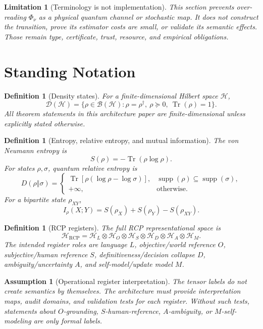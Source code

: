 \documentclass[11pt,a4paper]{article}
\newtheorem{definition}[theorem]{Definition}
\newtheorem{assumption}[theorem]{Assumption}
\newtheorem{limitation}[theorem]{Limitation}
\newcommand{\D}{\mathcal D}
\newcommand{\Hcal}{\mathcal H}
\newcommand{\Tr}{\operatorname{Tr}}
\newcommand{\supp}{\operatorname{supp}}
\newcommand{\RCP}{\mathrm{RCP}}
\begin{document}
\begin{limitation}[Terminology is not implementation]
This section prevents over-reading \(\Phi_\nu\) as a physical quantum channel or stochastic map.  It does not construct the transition, prove its estimator costs are small, or validate its semantic effects.  Those remain type, certificate, trust, resource, and empirical obligations.
\end{limitation}

\section{Standing Notation}

\begin{definition}[Density states]
For a finite-dimensional Hilbert space \(\Hcal\),
\[
\D(\Hcal)=\{\rho\in\mathcal B(\Hcal):\rho=\rho^\dagger,\ \rho\succeq0,\ \Tr(\rho)=1\}.
\]
All theorem statements in this architecture paper are finite-dimensional unless explicitly stated otherwise.
\end{definition}

\begin{definition}[Entropy, relative entropy, and mutual information]
The von Neumann entropy is
\[
S(\rho)=-\Tr(\rho\log\rho).
\]
For states \(\rho,\sigma\), quantum relative entropy is
\[
D(\rho\Vert\sigma)=
\begin{cases}
\Tr[\rho(\log\rho-\log\sigma)],&\supp(\rho)\subseteq\supp(\sigma),\\
+\infty,&\text{otherwise.}
\end{cases}
\]
For a bipartite state \(\rho_{XY}\),
\[
I_\rho(X;Y)=S(\rho_X)+S(\rho_Y)-S(\rho_{XY}).
\]
\end{definition}

\begin{definition}[RCP registers]
The full RCP representational space is
\[
\Hcal_{\RCP}
=
\Hcal_L\otimes\Hcal_O\otimes\Hcal_S\otimes\Hcal_D\otimes\Hcal_A\otimes\Hcal_M.
\]
The intended register roles are language \(L\), objective/world reference \(O\), subjective/human reference \(S\), definitiveness/decision collapse \(D\), ambiguity/uncertainty \(A\), and self-model/update model \(M\).
\end{definition}

\begin{assumption}[Operational register interpretation]
The tensor labels do not create semantics by themselves. The architecture must provide interpretation maps, audit domains, and validation tests for each register. Without such tests, statements about \(O\)-grounding, \(S\)-human-reference, \(A\)-ambiguity, or \(M\)-self-modeling are only formal labels.
\end{assumption}
\end{document}
